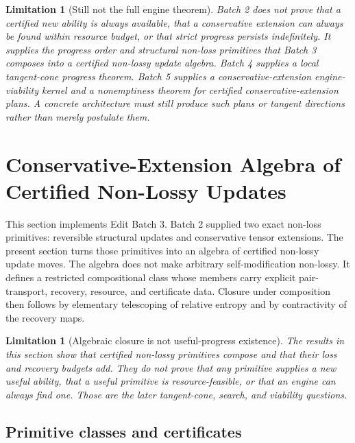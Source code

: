 \documentclass[11pt]{article}
\newtheorem{limitation}[theorem]{Limitation}
\newcommand{\1}{\mathbf{1}}
\begin{document}
\begin{limitation}[Still not the full engine theorem]
Batch 2 does not prove that a certified new ability is always available, that a conservative extension can always be found within resource budget, or that strict progress persists indefinitely.  It supplies the progress order and structural non-loss primitives that Batch 3 composes into a certified non-lossy update algebra.  Batch 4 supplies a local tangent-cone progress theorem.  Batch 5 supplies a conservative-extension engine-viability kernel and a nonemptiness theorem for certified conservative-extension plans.  A concrete architecture must still produce such plans or tangent directions rather than merely postulate them.
\end{limitation}



\section{Conservative-Extension Algebra of Certified Non-Lossy Updates}
\label{sec:conservative_extension_algebra}

This section implements Edit Batch 3.  Batch 2 supplied two exact non-loss primitives: reversible structural updates and conservative tensor extensions.  The present section turns those primitives into an algebra of certified non-lossy update moves.  The algebra does not make arbitrary self-modification non-lossy.  It defines a restricted compositional class whose members carry explicit pair-transport, recovery, resource, and certificate data.  Closure under composition then follows by elementary telescoping of relative entropy and by contractivity of the recovery maps.

\begin{limitation}[Algebraic closure is not useful-progress existence]
The results in this section show that certified non-lossy primitives compose and that their loss and recovery budgets add.  They do not prove that any primitive supplies a new useful ability, that a useful primitive is resource-feasible, or that an engine can always find one.  Those are the later tangent-cone, search, and viability questions.
\end{limitation}

\subsection{Primitive classes and certificates}
\end{document}
